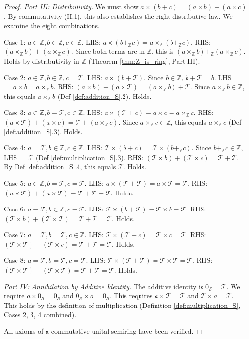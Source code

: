 \documentclass[11pt, a4paper]{article}
\theoremstyle{plain}
\theoremstyle{definition}
\numberwithin{equation}{section}
\newcommand{\Z}{\mathbb{Z}}
\newcommand{\Tobj}{\mathcal{T}} %
\newcommand{\SemiringS}{\mathcal{S}}
\begin{document}
\begin{proof}
\emph{Part III: Distributivity.} We must show $a\times(b+c) = (a\times b) + (a\times c)$. By commutativity (II.1), this also establishes the right distributive law. We examine the eight combinations.

Case 1: $a \in \Z, b \in \Z, c \in \Z$.
LHS: $a\times(b+_{\Z} c) = a\times_{\Z}(b+_{\Z} c)$.
RHS: $(a\times_{\Z} b) + (a\times_{\Z} c)$. Since both terms are in $\Z$, this is $(a\times_{\Z} b) +_{\Z} (a\times_{\Z} c)$.
Holds by distributivity in $\Z$ (Theorem \ref{thm:Z_is_ring}, Part III).

Case 2: $a \in \Z, b \in \Z, c=\Tobj$.
LHS: $a\times(b+\Tobj)$. Since $b \in \Z$, $b+\Tobj=b$. LHS $= a\times b = a\times_{\Z} b$.
RHS: $(a\times b) + (a\times\Tobj) = (a\times_{\Z} b) + \Tobj$. Since $a\times_{\Z} b \in \Z$, this equals $a\times_{\Z} b$ (Def \ref{def:addition_S}.2). Holds.

Case 3: $a \in \Z, b=\Tobj, c \in \Z$.
LHS: $a\times(\Tobj+c) = a\times c = a\times_{\Z} c$.
RHS: $(a\times\Tobj) + (a\times c) = \Tobj + (a\times_{\Z} c)$. Since $a\times_{\Z} c \in \Z$, this equals $a\times_{\Z} c$ (Def \ref{def:addition_S}.3). Holds.

Case 4: $a=\Tobj, b \in \Z, c \in \Z$.
LHS: $\Tobj\times(b+c) = \Tobj\times(b+_{\Z} c)$. Since $b+_{\Z} c \in \Z$, LHS $=\Tobj$ (Def \ref{def:multiplication_S}.3).
RHS: $(\Tobj\times b) + (\Tobj\times c) = \Tobj+\Tobj$. By Def \ref{def:addition_S}.4, this equals $\Tobj$. Holds.

Case 5: $a \in \Z, b=\Tobj, c=\Tobj$.
LHS: $a\times(\Tobj+\Tobj) = a\times\Tobj = \Tobj$.
RHS: $(a\times\Tobj) + (a\times\Tobj) = \Tobj+\Tobj = \Tobj$. Holds.

Case 6: $a=\Tobj, b \in \Z, c=\Tobj$.
LHS: $\Tobj\times(b+\Tobj) = \Tobj\times b = \Tobj$.
RHS: $(\Tobj\times b) + (\Tobj\times\Tobj) = \Tobj+\Tobj = \Tobj$. Holds.

Case 7: $a=\Tobj, b=\Tobj, c \in \Z$.
LHS: $\Tobj\times(\Tobj+c) = \Tobj\times c = \Tobj$.
RHS: $(\Tobj\times\Tobj) + (\Tobj\times c) = \Tobj+\Tobj = \Tobj$. Holds.

Case 8: $a=\Tobj, b=\Tobj, c=\Tobj$.
LHS: $\Tobj\times(\Tobj+\Tobj) = \Tobj\times\Tobj = \Tobj$.
RHS: $(\Tobj\times\Tobj) + (\Tobj\times\Tobj) = \Tobj+\Tobj = \Tobj$. Holds.

\emph{Part IV: Annihilation by Additive Identity.}
The additive identity is $0_{\SemiringS}=\Tobj$. We require $a\times 0_{\SemiringS} = 0_{\SemiringS}$ and $0_{\SemiringS} \times a = 0_{\SemiringS}$. This requires $a\times\Tobj = \Tobj$ and $\Tobj\times a = \Tobj$. This holds by the definition of multiplication (Definition \ref{def:multiplication_S}, Cases 2, 3, 4 combined).

All axioms of a commutative unital semiring have been verified.
\end{proof}
\end{document}
